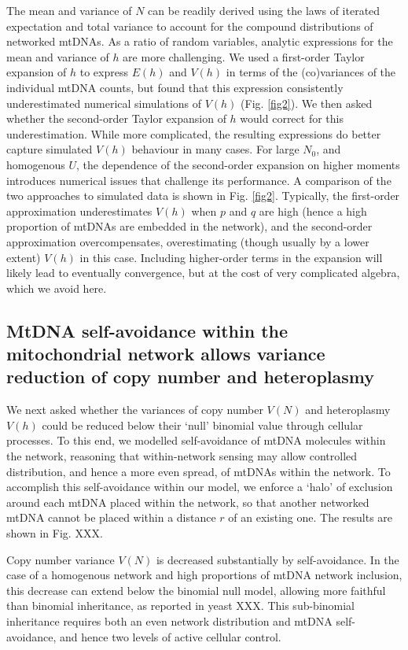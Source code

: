\documentclass{article}
\begin{document}
The mean and variance of $N$ can be readily derived using the laws of iterated expectation and total variance to account for the compound distributions of networked mtDNAs. As a ratio of random variables, analytic expressions for the mean and variance of $h$ are more challenging. We used a first-order Taylor expansion of $h$ to express $E(h)$ and $V(h)$ in terms of the (co)variances of the individual mtDNA counts, but found that this expression consistently underestimated numerical simulations of $V(h)$ (Fig. \ref{fig2}). We then asked whether the second-order Taylor expansion of $h$ would correct for this underestimation. While more complicated, the resulting expressions do better capture simulated $V(h)$ behaviour in many cases. For large $N_0$, and homogenous $U$, the dependence of the second-order expansion on higher moments introduces numerical issues that challenge its performance. A comparison of the two approaches to simulated data is shown in Fig. \ref{fig2}. Typically, the first-order approximation underestimates $V(h)$ when $p$ and $q$ are high (hence a high proportion of mtDNAs are embedded in the network), and the second-order approximation overcompensates, overestimating (though usually by a lower extent) $V(h)$ in this case. Including higher-order terms in the expansion will likely lead to eventually convergence, but at the cost of very complicated algebra, which we avoid here.



\subsection*{MtDNA self-avoidance within the mitochondrial network allows variance reduction of copy number and heteroplasmy}
We next asked whether the variances of copy number $V(N)$ and heteroplasmy $V(h)$ could be reduced below their `null' binomial value through cellular processes. To this end, we modelled self-avoidance of mtDNA molecules within the network, reasoning that within-network sensing may allow controlled distribution, and hence a more even spread, of mtDNAs within the network. To accomplish this self-avoidance within our model, we enforce a `halo' of exclusion around each mtDNA placed within the network, so that another networked mtDNA cannot be placed within a distance $r$ of an existing one. The results are shown in Fig. XXX. 

Copy number variance $V(N)$ is decreased substantially by self-avoidance. In the case of a homogenous network and high proportions of mtDNA network inclusion, this decrease can extend below the binomial null model, allowing more faithful than binomial inheritance, as reported in yeast XXX. This sub-binomial inheritance requires both an even network distribution and mtDNA self-avoidance, and hence two levels of active cellular control. 
\end{document}
